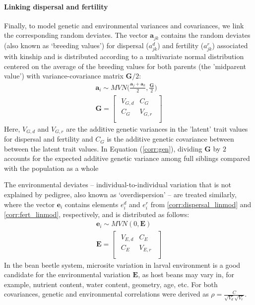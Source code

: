 \paragraph{Linking dispersal and fertility}
Finally, to model genetic and environmental variances and covariances, we link the corresponding random deviates. The vector $\bm{a}_{jk}$ contains the random deviates (also known as `breeding values') for dispersal ($a^{d}_{jk}$) and fertility ($a^{r}_{jk}$) associated with kinship and is distributed according to a multivariate normal distribution centered on the average of the breeding values for both parents (the 'midparent value') with variance-covariance matrix $\bm{G}/2$:
%
\begin{gather} \label{corr:gen}
  \bm{a}_{i} \sim \mathit{MVN} \Big( \frac{\bm{a}_{j} + \bm{a}_{k}}{2}, \frac{\bm{G}}{2} \Big) \\[10pt]
  \bm{G} =
  \begin{bmatrix}
    \begin{array}{ll}
      V_{G,d} &C_{G}   \\
      C_{G}   &V_{G,r} \\
    \end{array}
  \end{bmatrix}
\end{gather}
%
Here, $V_{G,d}$ and $V_{G,r}$ are the additive genetic variances in the 'latent' trait values for dispersal and fertility and $C_{G}$ is the additive genetic covariance between between the latent trait values. In Equation (\ref{corr:gen}), dividing $\bm{G}$ by $2$ accounts for the expected additive genetic variance among full siblings compared with the population as a whole \citep{roughgarden_theory_1979} 

The environmental deviates -- individual-to-individual variation that is not explained by pedigree, also known as `overdispersion' \citep{de2016general} -- are treated similarly, where the vector $\bm{e}_{i}$ contains elements $e^{d}_{i}$ and $e^{r}_{i}$ from \ref{corr:dispersal_linmod} and \ref{corr:fert_linmod}, respectively, and is distributed as follows:
%
\begin{gather} \label{corr:env}
  \bm{e}_{i} \sim \mathit{MVN} (0, \bm{E}) \\[5pt]
  \bm{E} =
  \begin{bmatrix}
    \begin{array}{ll}
      V_{E,d} &C_{E}   \\
      C_{E}   &V_{E,r} \\
    \end{array}
  \end{bmatrix}
\end{gather}
%
In the bean beetle system, microsite variation in larval environment is a good candidate for the environmental variation $\bm{E}$, as host beans may vary in, for example, nutrient content, water content, geometry, age, etc. For both covariances, genetic and environmental correlations were derived as $\rho = \frac{C}{\sqrt{V_{d}}\sqrt{V_{r}}}$. 

